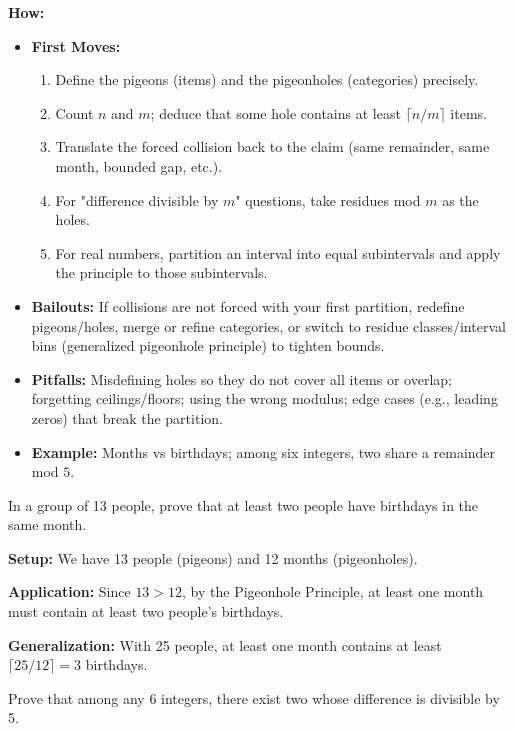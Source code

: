 \documentclass[12pt]{article}
\newenvironment{problem}[1]
{\begin{tcolorbox}[colback=blue!5!white,colframe=blue!75!black,title={#1}]}{\end{tcolorbox}}
\newenvironment{solution}
{\begin{tcolorbox}[colback=green!5!white,colframe=green!75!black,title={Solution}]}{\end{tcolorbox}}
\begin{document}
\textbf{How:}
\begin{itemize}
    \item \textbf{First Moves:}
    \begin{enumerate}[nosep]
        \item Define the pigeons (items) and the pigeonholes (categories) precisely.
        \item Count $n$ and $m$; deduce that some hole contains at least $\lceil n/m \rceil$ items.
        \item Translate the forced collision back to the claim (same remainder, same month, bounded gap, etc.).
        \item For "difference divisible by $m$" questions, take residues mod $m$ as the holes.
        \item For real numbers, partition an interval into equal subintervals and apply the principle to those subintervals.
    \end{enumerate}
    \item \textbf{Bailouts:} If collisions are not forced with your first partition, redefine pigeons/holes, merge or refine categories, or switch to residue classes/interval bins (generalized pigeonhole principle) to tighten bounds.
    \item \textbf{Pitfalls:} Misdefining holes so they do not cover all items or overlap; forgetting ceilings/floors; using the wrong modulus; edge cases (e.g., leading zeros) that break the partition.
    \item \textbf{Example:} Months vs birthdays; among six integers, two share a remainder mod $5$.
\end{itemize}

\begin{problem}{Example: Birthday Problem Variant}
In a group of 13 people, prove that at least two people have birthdays in the same month.
\end{problem}

\begin{solution}
\textbf{Setup:} We have 13 people (pigeons) and 12 months (pigeonholes).

\textbf{Application:} Since $13 > 12$, by the Pigeonhole Principle, at least one month must contain at least two people's birthdays.

\textbf{Generalization:} With 25 people, at least one month contains at least $\lceil 25/12 \rceil = 3$ birthdays.
\end{solution}

\begin{problem}{AMC 12 Example}
Prove that among any 6 integers, there exist two whose difference is divisible by 5.
\end{problem}
\end{document}
